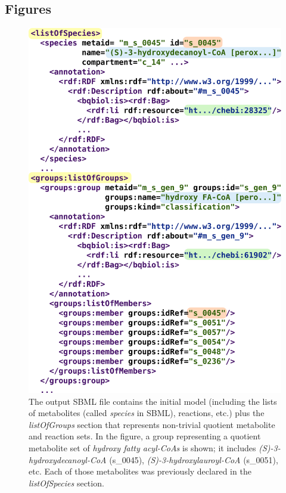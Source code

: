 \documentclass{bmcart}
\begin{document}
\begin{backmatter}

\section*{Figures}
 
      \begin{figure}[h!]
\centering
\includegraphics[scale=0.4]{groups.png}
\caption{
\label{fig:groups}
The output SBML file contains the initial model (including the lists of metabolites (called \emph{species} in SBML), reactions, etc.) plus the \emph{listOfGroups} section that represents non-trivial quotient metabolite and reaction sets. In the figure, a group representing a quotient metabolite set of \emph{hydroxy fatty acyl-CoAs} is shown; it includes \emph{(S)-3-hydroxydecanoyl-CoA} (s\_0045),  \emph{(S)-3-hydroxylauroyl-CoA} (s\_0051), etc. Each of those metabolites was previously declared in the \emph{listOfSpecies} section.}
\end{figure}


\end{backmatter}
\end{document}
